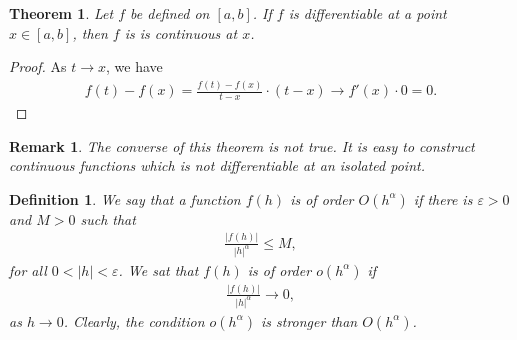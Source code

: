 \documentclass[10pt]{book}
\newtheorem{definition}{Definition}[chapter]
\newtheorem{theorem}{Theorem}[chapter]
\newtheorem{remark}{Remark}[chapter]
\theoremstyle{definition}
\numberwithin{equation}{chapter}
\begin{document}
\medskip

\begin{theorem}
Let $f$ be defined on $[a,b]$. If $f$ is differentiable at a point $x \in [a,b]$, then $f$ is is continuous at $x$.
\end{theorem}
\begin{proof}
As $t \to x$, we have 
\begin{align*}
    f(t) - f(x) = \frac{f(t) - f(x)}{t - x} \cdot (t - x) \to f'(x) \cdot 0 = 0.
\end{align*}
\end{proof}

\begin{remark}
The converse of this theorem is not true. It is easy to construct continuous functions which is not differentiable at an isolated point. 
\end{remark}

\medskip

\begin{definition}
We say that a function $f(h)$ is of order $O(h^{\alpha})$ if there is $\varepsilon > 0$ and $M > 0$ such that 
\begin{align*}
    \frac{\left|f(h)\right|}{\left|h\right|^{\alpha}} \leq M,
\end{align*}
for all $0 < \left|h\right| < \varepsilon$. We sat that $f(h)$ is of order $o(h^{\alpha})$ if 
\begin{align*}
    \frac{\left|f(h)\right|}{\left|h\right|^{\alpha}} \to 0,
\end{align*}
as $h \to 0$. Clearly, the condition $o(h^{\alpha})$ is stronger than $O(h^{\alpha})$. 
\end{definition}

\medskip
\end{document}
